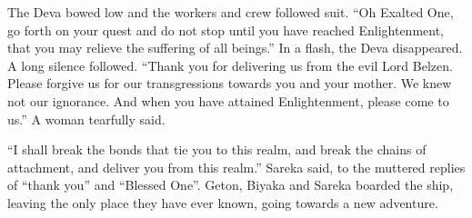 The Deva bowed low and the workers and crew followed suit. “Oh Exalted One, go forth on your quest and do not stop until you have reached Enlightenment, that you may relieve the suffering of all beings.” In a flash, the Deva disappeared. A long silence followed. “Thank you for delivering us from the evil Lord Belzen. Please forgive us for our transgressions towards you and your mother. We knew not our ignorance. And when you have attained Enlightenment, please come to us.” A woman tearfully said.

“I shall break the bonds that tie you to this realm, and break the chains of attachment, and deliver you from this realm.” Sareka said, to the muttered replies of “thank you” and “Blessed One”. Geton, Biyaka and Sareka boarded the ship, leaving the only place they have ever known, going towards a new adventure.
